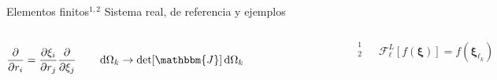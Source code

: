 

\begin{frame}{Elementos finitos$^{1,2}$}
{Sistema real, de referencia y ejemplos}\small

\begin{columns}
$$
    \pdv{r_i} = \pdv{\xi_i}{r_j} \pdv{\xi_j}
    \qquad
    \dd{\Omega_k} \to \det[\mathbbm{J}]\dd{\Omega_k}
$$
 \begin{figure}\centering    \fontsize{4}{5} \selectfont
        \def\svgwidth{\textwidth}
\end{figure}
\vspace*{1em}
	\noindent\rule{.25\textwidth}{0.4pt}
 \begin{spacing}{0}\fontsize{4}{12} \selectfont
	$^1$ \\
	$^2$ 
	\end{spacing}

$$  \mathcal{F}^{L}_\ell[f(\boldsymbol{\xi})] = f(\boldsymbol{\xi}_{\ell_k}) $$
\begin{figure} \fontsize{4}{5} \selectfont
    \def\svgwidth{\textwidth}
\end{figure}
\end{columns}
\end{frame}


